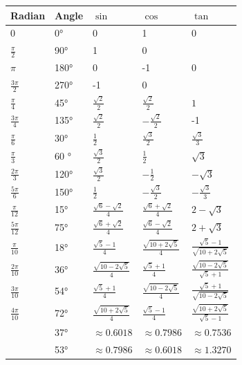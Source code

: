 \documentclass[a4paper,12pt]{report}
\begin{document}
{\fontsize{8pt}{10pt}\selectfont
\begin{longtable}[c]{|p{}|p{}|p{}|p{}|p{}|}
\hline
Radian & Angle & $\sin$ & $\cos$ & $\tan$ \\ \hline
0 & 0° & 0 & 1 & 0 \\ \hline
$\frac{\pi}{2}$ & 90° & 1 & 0 & \\ \hline
$\pi$ & 180° & 0 & -1 & 0 \\ \hline
$\frac{3\pi}{2}$ & 270° & -1 & 0 & \\ \hline
$\frac{\pi}{4}$ & 45° & $\frac{\sqrt{2}}{2}$ & $\frac{\sqrt{2}}{2}$ & $1$ \\ \hline
$\frac{3\pi}{4}$ & 135° & $\frac{\sqrt{2}}{2}$ & $-\frac{\sqrt{2}}{2}$ & -1 \\ \hline
$\frac{\pi}{6}$ & 30° & $\frac{1}{2}$ & $\frac{\sqrt{3}}{2}$ & $\frac{\sqrt{3}}{3}$ \\ \hline
$\frac{\pi}{3}$ & 60 ° & $\frac{\sqrt{3}}{2}$ & $\frac{1}{2}$ & $\sqrt{3}$ \\ \hline
$\frac{2\pi}{3}$ & 120° & $\frac{\sqrt{3}}{2}$ & $-\frac{1}{2}$ & $-\sqrt{3}$ \\ \hline
$\frac{5\pi}{6}$ & 150° & $\frac{1}{2}$ & $-\frac{\sqrt{3}}{2}$ & $-\frac{\sqrt{3}}{3}$ \\ \hline
$\frac{\pi}{12}$ & 15° & $\frac{\sqrt{6}-\sqrt{2}}{4}$ & $\frac{\sqrt{6}+\sqrt{2}}{4}$ & $2-\sqrt{3}$ \\ \hline
$\frac{5\pi}{12}$ & 75° & $\frac{\sqrt{6}+\sqrt{2}}{4}$ & $\frac{\sqrt{6}-\sqrt{2}}{4}$ & $2+\sqrt{3}$ \\ \hline
$\frac{\pi}{10}$ & 18° & $\frac{\sqrt{5}-1}{4}$ & $\frac{\sqrt{10+2\sqrt{5}}}{4}$ & $\frac{\sqrt{5}-1}{\sqrt{10+2\sqrt{5}}}$ \\ \hline
$\frac{2\pi}{10}$ & 36° & $\frac{\sqrt{10-2\sqrt{5}}}{4}$ & $\frac{\sqrt{5}+1}{4}$ & $\frac{\sqrt{10-2\sqrt{5}}}{\sqrt{5}+1}$ \\ \hline
$\frac{3\pi}{10}$ & 54° & $\frac{\sqrt{5}+1}{4}$ & $\frac{\sqrt{10-2\sqrt{5}}}{4}$ & $\frac{\sqrt{5}+1}{\sqrt{10-2\sqrt{5}}}$ \\ \hline
$\frac{4\pi}{10}$ & 72° & $\frac{\sqrt{10+2\sqrt{5}}}{4}$ & $\frac{\sqrt{5}-1}{4}$ & $\frac{\sqrt{10+2\sqrt{5}}}{\sqrt{5}-1}$ \\ \hline
& 37° & $\approx 0.6018$ & $\approx 0.7986$ & $\approx 0.7536$ \\ \hline
& 53° & $\approx 0.7986$ & $\approx 0.6018$ & $\approx 1.3270$ \\ \hline
\end{longtable}}
\end{document}
